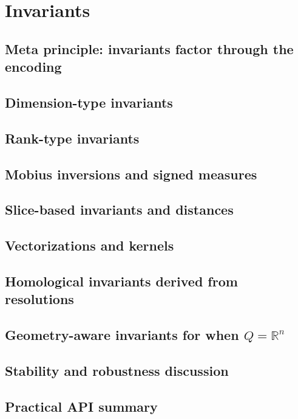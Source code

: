 \documentclass{article}
\newcommand{\<}{\langle}
\renewcommand{\>}{\rangle}
\theoremstyle{definition}
\theoremstyle{remark}
\begin{document}
	
	\section{Invariants}
	
	\subsection{Meta principle: invariants factor through the encoding}
	
	\subsection{Dimension-type invariants}
	
	\subsection{Rank-type invariants}
	
	\subsection{Mobius inversions and signed measures}
	
	\subsection{Slice-based invariants and distances}
	
	\subsection{Vectorizations and kernels}
	
	\subsection{Homological invariants derived from resolutions}
	
	\subsection{Geometry-aware invariants for when $Q = \mathbb{R}^n$}
	
	\subsection{Stability and robustness discussion}
	
	\subsection{Practical API summary}
	
\end{document}
